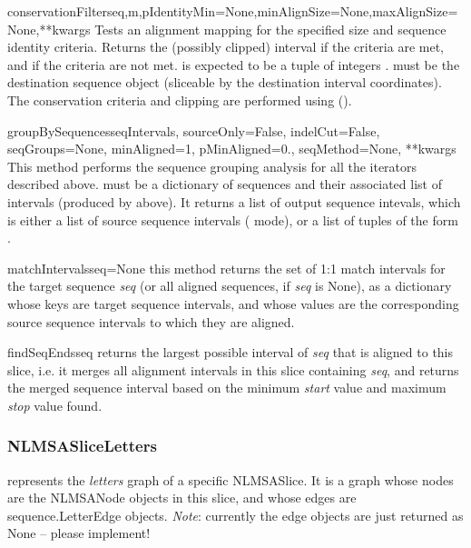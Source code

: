 \documentclass{howto}
\begin{document}
\begin{funcdesc}{conservationFilter}{seq,m,pIdentityMin=None,minAlignSize=None,maxAlignSize=None,**kwargs}
  Tests an alignment mapping  for the specified size and sequence 
  identity criteria.  Returns the (possibly clipped) interval  if
  the criteria are met, and  if the criteria are not met.  
  is expected to be a tuple of integers .
   must be the destination sequence object (sliceable by the destination
  interval coordinates).  The conservation criteria and clipping are performed
  using ().
\end{funcdesc}

\begin{funcdesc}{groupBySequences}{seqIntervals, sourceOnly=False, indelCut=False, seqGroups=None, minAligned=1, pMinAligned=0., seqMethod=None, **kwargs}
  This method performs the sequence grouping analysis for all the iterators
  described above.   must be a dictionary of sequences
  and their associated list of intervals (produced by 
  above).  It returns a list of output sequence intevals, which is either
  a list of source sequence intervals ( mode), or a list
  of tuples of the form .
\end{funcdesc}


\begin{funcdesc}{matchIntervals}{seq=None}
  this method returns the set of
  1:1 match intervals for the target sequence {\em seq} (or all
  aligned sequences, if {\em seq} is None), as a dictionary
  whose keys are target sequence intervals, and whose values are
  the corresponding source sequence intervals to which they are
  aligned.
\end{funcdesc}

\begin{funcdesc}{findSeqEnds}{seq}
  returns the largest possible interval of
  {\em seq} that is aligned to this slice, i.e. it merges all 
  alignment intervals in this slice containing {\em seq}, and
  returns the merged sequence interval based on the minimum {\em start}
  value and maximum {\em stop} value found.
\end{funcdesc}

\subsubsection{NLMSASliceLetters}
represents the {\em letters} graph of a specific NLMSASlice.  It is
a graph whose nodes are the NLMSANode objects in this slice, and whose
edges are sequence.LetterEdge objects. {\em Note}: currently the edge objects
are just returned as None -- please implement!
\end{document}
